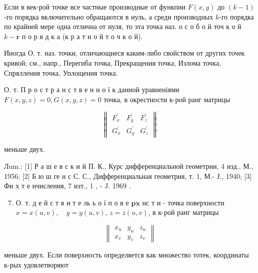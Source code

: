 \documentclass[10pt]{article}
\begin{document}
Если в век-рой точке все частные производные от функпии $F(x, y)$ до $(k-1)$-го порядка включительно обращаются в нуль, а среди производных $k$-го порядка по крайней мере одна отлична от нуля, то эта точка наз. о с о б о й точ к о й $k-\mathbf{r}$ п о р я д к а (к р а т н о й т $о$ ч к о й).



Иногда О. т. наз. точки, отличающиеся каким-либо свойством от других точек кривой; см., напр., Перегиба точка, Прекращения точка, Излома точка, Спрялления точка, Уплощения точка.



О. т. П р о с т р а н с т в е н н о ї к данной уравненіями $F(x, y, z)=0, G(x, y, z)=0$ точка, в окрестности к-рой ранг матрицы



\[

\left\|\begin{array}{lll}

F_{x}^{\prime} & F_{y}^{\prime} & F_{z}^{\prime} \\

G_{x}^{\prime} & G_{y}^{\prime} & G_{z}^{\prime}

\end{array}\right\|

\]



меньше двух.



Лum.: [1] Р а ш е в с к и й П. К., Курс дифференциальной геометрии, 4 изд., М., 1956; [2] Б ю ш ге н с С. С., Дифференциальная геометрия, т. 1, М.- Ј., 1940; [3] Фи х т е нчисления, 7 изт., 1 , - J. 1969 .



\begin{enumerate}

  \setcounter{enumi}{6}

  \item О. т. д е й с т в и т е ль ь о ї п о в е $\mathbf{p} \mathbf{x}$ нс т и - точка поверхности $x=x(u, v), \quad y=y(u, v)$, $z=z(u, v)$, в к-рой ранг матрицы

\end{enumerate}



\[

\left\|\begin{array}{lll}

x_{u} & y_{u} & z_{u} \\

x_{v} & y_{v} & z_{v}

\end{array}\right\|

\]



меньше двух. Если поверхность определяется как множество тотек, координаты к-рых удовлетворяют
\end{document}
